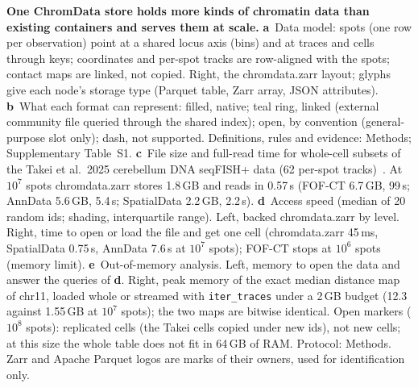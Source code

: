 \textbf{One ChromData store holds more kinds of chromatin data than existing containers and serves them at scale.}
\textbf{a}~Data model: spots (one row per observation) point at a shared locus axis (bins) and at traces and cells through keys; coordinates and per-spot tracks are row-aligned with the spots; contact maps are linked, not copied.
Right, the chromdata.zarr layout; glyphs give each node's storage type (Parquet table, Zarr array, JSON attributes).
\textbf{b}~What each format can represent: filled, native; teal ring, linked (external community file queried through the shared index); open, by convention (general-purpose slot only); dash, not supported. Definitions, rules and evidence: Methods; Supplementary Table~S1.
\textbf{c}~File size and full-read time for whole-cell subsets of the Takei et al.\ 2025 cerebellum DNA seqFISH+ data (62 per-spot tracks)~\citep{takei2025}. At $10^{7}$ spots chromdata.zarr stores 1.8\,GB and reads in 0.57\,s (FOF-CT 6.7\,GB, 99\,s; AnnData 5.6\,GB, 5.4\,s; SpatialData 2.2\,GB, 2.2\,s).
\textbf{d}~Access speed (median of 20 random ids; shading, interquartile range).
Left, backed chromdata.zarr by level.
Right, time to open or load the file and get one cell (chromdata.zarr 45\,ms, SpatialData 0.75\,s, AnnData 7.6\,s at $10^{7}$ spots); FOF-CT stops at $10^{6}$ spots (memory limit).
\textbf{e}~Out-of-memory analysis.
Left, memory to open the data and answer the queries of \textbf{d}.
Right, peak memory of the exact median distance map of chr11, loaded whole or streamed with \texttt{iter\_traces} under a 2\,GB budget (12.3 against 1.55\,GB at $10^{7}$ spots); the two maps are bitwise identical.
Open markers ($10^{8}$ spots): replicated cells (the Takei cells copied under new ids), not new cells; at this size the whole table does not fit in 64\,GB of RAM.
Protocol: Methods.
Zarr and Apache Parquet logos are marks of their owners, used for identification only.
